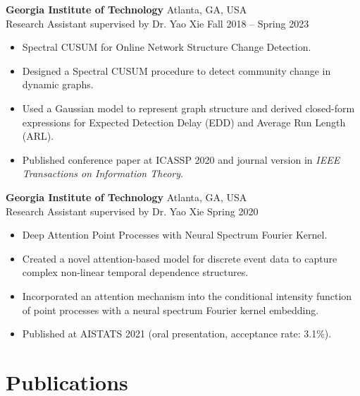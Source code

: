 \documentclass[10pt,letterpaper]{article}
\newcommand{\entry}[4]{%
  \noindent\hspace{1.2em}\begin{minipage}[t]{\dimexpr\textwidth-1.2em\relax}
    \textbf{#1} \hfill #2 \\
    #3 \hfill #4
  \end{minipage}\par\vspace{0.1em}
}
\newenvironment{cvitems}{%
  \begin{itemize}[leftmargin=2.8em,label=--,topsep=1pt,itemsep=1pt,parsep=0pt]
}{%
  \end{itemize}\vspace{0.2em}
}
\begin{document}
\entry{Georgia Institute of Technology}{Atlanta, GA, USA}{Research Assistant supervised by Dr. Yao Xie}{Fall 2018 -- Spring 2023}
\begin{cvitems}
  \item Spectral CUSUM for Online Network Structure Change Detection.
  \item Designed a Spectral CUSUM procedure to detect community change in dynamic graphs.
  \item Used a Gaussian model to represent graph structure and derived closed-form expressions for Expected Detection Delay (EDD) and Average Run Length (ARL).
  \item Published conference paper at ICASSP 2020 and journal version in \textit{IEEE Transactions on Information Theory}.
\end{cvitems}

\entry{Georgia Institute of Technology}{Atlanta, GA, USA}{Research Assistant supervised by Dr. Yao Xie}{Spring 2020}
\begin{cvitems}
  \item Deep Attention Point Processes with Neural Spectrum Fourier Kernel.
  \item Created a novel attention-based model for discrete event data to capture complex non-linear temporal dependence structures.
  \item Incorporated an attention mechanism into the conditional intensity function of point processes with a neural spectrum Fourier kernel embedding.
  \item Published at AISTATS 2021 (oral presentation, acceptance rate: 3.1\%).
\end{cvitems}

\newpage
\section{Publications}
\end{document}
